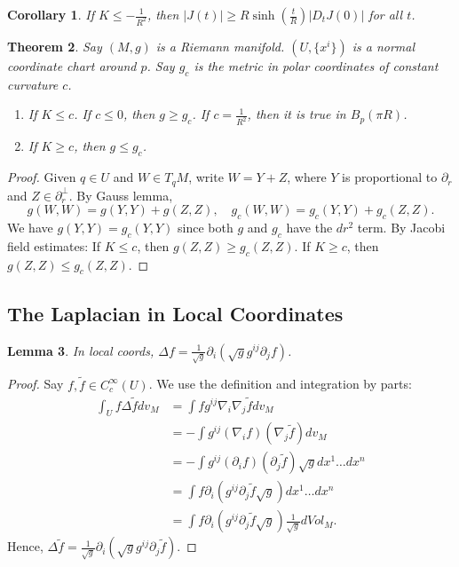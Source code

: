 \documentclass[11pt, a4paper]{article}
\theoremstyle{plain}
\newtheorem{theorem}{Theorem}[section]
\newtheorem{lemma}[theorem]{Lemma}
\newtheorem{corollary}[theorem]{Corollary}
\theoremstyle{definition}
\theoremstyle{remark}
\begin{document}
{\begin{corollary}
If $K \le -\frac{1}{R^2}$, then $|J(t)| \ge R \sinh(\frac{t}{R}) |D_t J(0)|$ for all $t$.
\end{corollary}

\begin{theorem}
Say $(M,g)$ is a Riemann manifold. $(U, \{x^i\})$ is a normal coordinate chart around $p$. Say $g_c$ is the metric in polar coordinates of constant curvature $c$.
\begin{enumerate}
    \item If $K \le c$. If $c \le 0$, then $g \ge g_c$. If $c = \frac{1}{R^2}$, then it is true in $B_p(\pi R)$.
    \item If $K \ge c$, then $g \le g_c$.
\end{enumerate}
\end{theorem}

\begin{proof}
Given $q \in U$ and $W \in T_q M$, write $W = Y + Z$, where $Y$ is proportional to $\partial_r$ and $Z \in \partial_r^\perp$. By Gauss lemma, 
\[ g(W,W) = g(Y,Y) + g(Z,Z), \quad g_c(W,W) = g_c(Y,Y) + g_c(Z,Z). \]
We have $g(Y,Y) = g_c(Y,Y)$ since both $g$ and $g_c$ have the $dr^2$ term.
By Jacobi field estimates:
If $K \le c$, then $g(Z,Z) \ge g_c(Z,Z)$.
If $K \ge c$, then $g(Z,Z) \le g_c(Z,Z)$.
\end{proof}

\subsection{The Laplacian in Local Coordinates}

\begin{lemma}
In local coords, $\Delta f = \frac{1}{\sqrt{g}} \partial_i (\sqrt{g} g^{ij} \partial_j f)$.
\end{lemma}

\begin{proof}
Say $f, \tilde{f} \in C_c^\infty(U)$. We use the definition and integration by parts:
\begin{align*}
    \int_U f \Delta \tilde{f} dv_M &= \int f g^{ij} \nabla_i \nabla_j \tilde{f} dv_M \\
    &= - \int g^{ij} (\nabla_i f)(\nabla_j \tilde{f}) dv_M \\
    &= - \int g^{ij} (\partial_i f)(\partial_j \tilde{f}) \sqrt{g} dx^1 \dots dx^n \\
    &= \int f \partial_i (g^{ij} \partial_j \tilde{f} \sqrt{g}) dx^1 \dots dx^n \\
    &= \int f \partial_i (g^{ij} \partial_j \tilde{f} \sqrt{g}) \frac{1}{\sqrt{g}} dVol_M.
\end{align*}
Hence, $\Delta \tilde{f} = \frac{1}{\sqrt{g}} \partial_i (\sqrt{g} g^{ij} \partial_j \tilde{f})$.
\end{proof}

}
\end{document}
